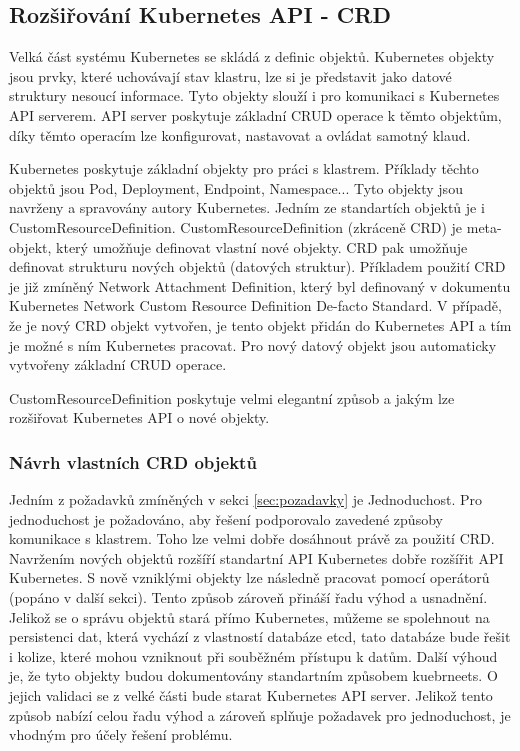 

\subsection{Rozšiřování Kubernetes API - CRD}
Velká část systému Kubernetes se skládá z definic objektů. Kubernetes objekty jsou prvky, které uchovávají stav klastru, lze si je představit jako datové struktury nesoucí informace. Tyto objekty slouží i pro komunikaci s Kubernetes API serverem. API server poskytuje základní CRUD operace k těmto objektům, díky těmto operacím lze konfigurovat, nastavovat a ovládat samotný klaud.

Kubernetes poskytuje základní objekty pro práci s klastrem. Příklady těchto objektů jsou Pod, Deployment, Endpoint, Namespace... Tyto objekty jsou navrženy a spravovány autory Kubernetes. Jedním ze standartích objektů je i CustomResourceDefinition. CustomResourceDefinition (zkráceně CRD) je meta-objekt, který umožňuje definovat vlastní nové objekty. CRD pak umožňuje definovat strukturu nových objektů (datových struktur). Příkladem použití CRD je již zmíněný Network Attachment Definition, který byl definovaný v dokumentu Kubernetes Network Custom Resource Definition De-facto Standard. V případě, že je nový CRD objekt vytvořen, je tento objekt přidán do Kubernetes API a tím je možné s ním Kubernetes pracovat. Pro nový datový objekt jsou automaticky vytvořeny základní CRUD operace.

CustomResourceDefinition poskytuje velmi elegantní způsob a jakým lze rozšiřovat Kubernetes API o nové objekty.  
\subsubsection{Návrh vlastních CRD objektů}
Jedním z požadavků zmíněných v sekci \ref{sec:pozadavky} je Jednoduchost. Pro jednoduchost je požadováno, aby řešení podporovalo zavedené způsoby komunikace s klastrem. Toho lze velmi dobře dosáhnout právě za použití CRD. Navržením nových objektů rozšíří standartní API Kubernetes dobře rozšířit API Kubernetes. S nově vzniklými objekty lze následně pracovat pomocí operátorů (popáno v další sekci). Tento způsob zároveň přináší řadu výhod a usnadnění. Jelikož se o správu objektů stará přímo Kubernetes, můžeme se spolehnout na persistenci dat, která vychází z vlastností databáze etcd, tato databáze bude řešit i kolize, které mohou vzniknout při souběžném přístupu k datům. Další výhoud je, že tyto objekty budou dokumentovány standartním způsobem kuebrneets. O jejich validaci se z velké části bude starat Kubernetes API server. Jelikož tento způsob nabízí celou řadu výhod a zároveň splňuje požadavek pro jednoduchost, je vhodným pro účely řešení problému.

